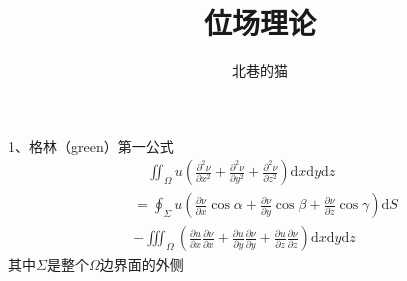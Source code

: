 \documentclass[UTF8]{ctexart}       %
\author{北巷的猫}
\title{位场理论}
\begin{document}
\maketitle      %

1、格林（green）第一公式
\begin{align*}      %
&\quad\iint_\Omega u\left(
\frac{\partial^2 \nu}{\partial x^2}
+\frac{\partial^2 \nu}{\partial y^2}
+\frac{\partial^2 \nu}{\partial z^2} \right)
\mathrm{d}x\mathrm{d}y\mathrm{d}z \\
& =\oint_\Sigma u \left(
\frac{\partial \nu}{\partial x}\cos \alpha
+\frac{\partial \nu}{\partial y}\cos\beta
+\frac{\partial \nu}{\partial z}\cos\gamma
\right)\mathrm{d}S \\
& -\iiint_\Omega\left(\frac{\partial u}{\partial x}\frac{\partial \nu}{\partial x}
+\frac{\partial u}{\partial y}\frac{\partial\nu}{\partial y}+
\frac{\partial u}{\partial z}\frac{\partial \nu}{\partial z} \right)
\mathrm{d}x\mathrm{d}y\mathrm{d}z
\end{align*}
其中$\Sigma$是整个$\Omega$边界面的外侧
\end{document}
